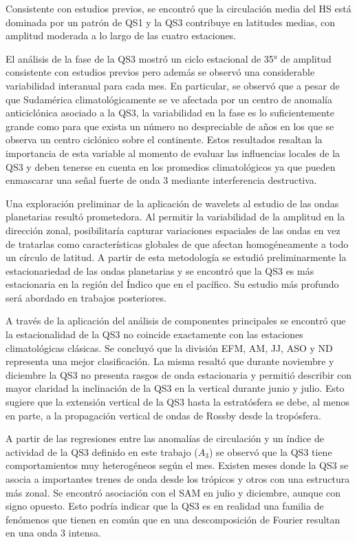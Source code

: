 \documentclass[spanish,a4paper,12pt,oneside]{book}
\begin{document}
Consistente con estudios previos, se encontró que la circulación media
del HS está dominada por un patrón de QS1 y la QS3 contribuye en
latitudes medias, con amplitud moderada a lo largo de las cuatro
estaciones.

El análisis de la fase de la QS3 mostró un ciclo estacional de 35° de
amplitud consistente con estudios previos pero además se observó una
considerable variabilidad interanual para cada mes. En particular, se
observó que a pesar de que Sudamérica climatológicamente se ve afectada
por un centro de anomalía anticiclónica asociado a la QS3, la
variabilidad en la fase es lo suficientemente grande como para que
exista un número no despreciable de años en los que se observa un centro
ciclónico sobre el continente. Estos resultados resaltan la importancia
de esta variable al momento de evaluar las influencias locales de la QS3
y deben tenerse en cuenta en los promedios climatológicos ya que pueden
enmascarar una señal fuerte de onda 3 mediante interferencia
destructiva.

Una exploración preliminar de la aplicación de wavelets al estudio de
las ondas planetarias resultó prometedora. Al permitir la variabilidad
de la amplitud en la dirección zonal, posibilitaría capturar variaciones
espaciales de las ondas en vez de tratarlas como características
globales de que afectan homogéneamente a todo un círculo de latitud. A
partir de esta metodología se estudió preliminarmente la estacionariedad
de las ondas planetarias y se encontró que la QS3 es más estacionaria en
la región del Índico que en el pacífico. Su estudio más profundo será
abordado en trabajos posteriores.

A través de la aplicación del análisis de componentes principales se
encontró que la estacionalidad de la QS3 no coincide exactamente con las
estaciones climatológicas clásicas. Se concluyó que la división EFM, AM,
JJ, ASO y ND representa una mejor clasificación. La misma resaltó que
durante noviembre y diciembre la QS3 no presenta rasgos de onda
estacionaria y permitió describir con mayor claridad la inclinación de
la QS3 en la vertical durante junio y julio. Esto sugiere que la
extensión vertical de la QS3 hasta la estratósfera se debe, al menos en
parte, a la propagación vertical de ondas de Rossby desde la tropósfera.

A partir de las regresiones entre las anomalías de circulación y un
índice de actividad de la QS3 definido en este trabajo (\(A_3\)) se
observó que la QS3 tiene comportamientos muy heterogéneos según el mes.
Existen meses donde la QS3 se asocia a importantes trenes de onda desde
los trópicos y otros con una estructura más zonal. Se encontró
asociación con el SAM en julio y diciembre, aunque con signo opuesto.
Esto podría indicar que la QS3 es en realidad una familia de fenómenos
que tienen en común que en una descomposición de Fourier resultan en una
onda 3 intensa.
\end{document}
